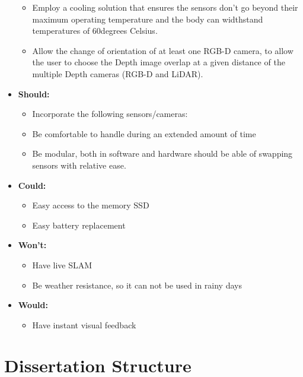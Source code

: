 \begin{itemize}
\begin{itemize}
        \item Employ a cooling solution that ensures the sensors don't go beyond their maximum operating temperature and the body can widthstand temperatures of 60degrees Celsius.
        \item Allow the change of orientation of at least one RGB-D camera, to allow the user to choose the Depth image overlap at a given distance of the multiple Depth cameras (RGB-D and LiDAR).
    \end{itemize}
    \item \textbf{Should:}
    \begin{itemize}
        \item Incorporate the following sensors/cameras: 
        \item Be comfortable to handle during an extended amount of time
        \item Be modular, both in software and hardware should be able of swapping sensors with relative ease.
    \end{itemize}
    \item \textbf{Could:}
    \begin{itemize}   
        \item Easy access to the memory SSD
        \item Easy battery replacement
    \end{itemize}
    \item \textbf{Won't:}
    \begin{itemize}
        \item Have live \acl*{SLAM}
        \item Be weather resistance, so it can  not be used in rainy days
    \end{itemize}
    \item \textbf{Would:}
    \begin{itemize}
        \item Have instant visual feedback
    \end{itemize}
\end{itemize}


\section{Dissertation Structure}